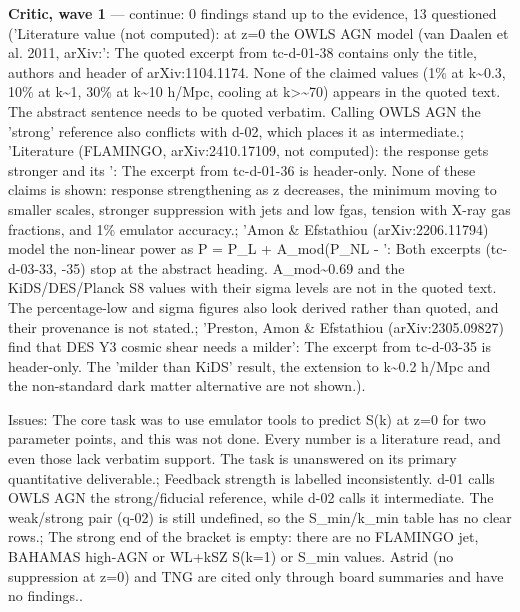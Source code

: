 \documentclass[11pt,a4paper]{article}
\begin{document}
\textbf{Critic, wave 1} --- continue: 0 findings stand up to the evidence, 13 questioned ('Literature value (not computed): at z=0 the OWLS AGN model (van Daalen et al. 2011, arXiv:': The quoted excerpt from tc-d-01-38 contains only the title, authors and header of arXiv:1104.1174. None of the claimed values (1\% at k\textasciitilde{}0.3, 10\% at k\textasciitilde{}1, 30\% at k\textasciitilde{}10 h/Mpc, cooling at k\textgreater{}\textasciitilde{}70) appears in the quoted text. The abstract sentence needs to be quoted verbatim. Calling OWLS AGN the 'strong' reference also conflicts with d-02, which places it as intermediate.; 'Literature (FLAMINGO, arXiv:2410.17109, not computed): the response gets stronger and its ': The excerpt from tc-d-01-36 is header-only. None of these claims is shown: response strengthening as z decreases, the minimum moving to smaller scales, stronger suppression with jets and low fgas, tension with X-ray gas fractions, and 1\% emulator accuracy.; 'Amon \& Efstathiou (arXiv:2206.11794) model the non-linear power as P = P\_L + A\_mod(P\_NL - ': Both excerpts (tc-d-03-33, -35) stop at the abstract heading. A\_mod\textasciitilde{}0.69 and the KiDS/DES/Planck S8 values with their sigma levels are not in the quoted text. The percentage-low and sigma figures also look derived rather than quoted, and their provenance is not stated.; 'Preston, Amon \& Efstathiou (arXiv:2305.09827) find that DES Y3 cosmic shear needs a milder': The excerpt from tc-d-03-35 is header-only. The 'milder than KiDS' result, the extension to k\textasciitilde{}0.2 h/Mpc and the non-standard dark matter alternative are not shown.).

Issues: The core task was to use emulator tools to predict S(k) at z=0 for two parameter points, and this was not done. Every number is a literature read, and even those lack verbatim support. The task is unanswered on its primary quantitative deliverable.; Feedback strength is labelled inconsistently. d-01 calls OWLS AGN the strong/fiducial reference, while d-02 calls it intermediate. The weak/strong pair (q-02) is still undefined, so the S\_min/k\_min table has no clear rows.; The strong end of the bracket is empty: there are no FLAMINGO jet, BAHAMAS high-AGN or WL+kSZ S(k=1) or S\_min values. Astrid (no suppression at z=0) and TNG are cited only through board summaries and have no findings..
\end{document}
